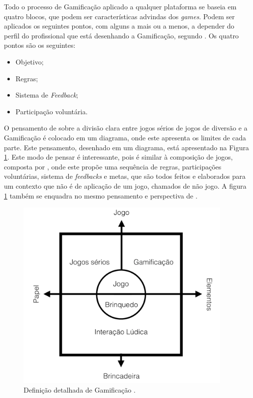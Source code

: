 Todo o processo de Gamificação aplicado a qualquer plataforma se baseia em
quatro blocos, que podem ser características advindas dos \textit{games}. Podem ser
aplicados os seguintes pontos, com alguns a mais ou a menos, a depender
do perfil do profissional que está desenhando a Gamificação, segundo \cite{mcgonigal2011reality}.
Os quatro pontos são os seguintes:

\begin{itemize}
    \item Objetivo;
    \item Regras;
    \item Sistema de \textit{Feedback};
    \item Participação voluntária.
\end{itemize}

O pensamento de \cite{deterding2011gamification}  sobre a divisão clara entre jogos sérios
de jogos de diversão e a Gamificação é colocado em um diagrama, onde este
apresenta os limites de cada parte. Este pensamento, desenhado em um diagrama,
está apresentado na Figura \ref{fig:gamificacaodetalhada}. Este modo de pensar é interessante, pois
é similar à composição de jogos, composta por \cite{mcgonigal2011reality}, onde este
propõe uma sequência de regras, participações voluntárias, sistema de
\textit{feedbacks} e metas, que são todos feitos e elaborados para um contexto que
não é de aplicação de um jogo, chamados de não jogo. A figura \ref{fig:gamificacaodetalhada}
também se enquadra no mesmo pensamento e perspectiva de \cite{mcgonigal2011reality}.

\begin{figure}[h]
    \centering
    \includegraphics[width=400px, scale=1]{figuras/gamificacaodetalhada}
    \caption{Definição detalhada de Gamificação \cite{mcgonigal2011reality}. }
    \label{fig:gamificacaodetalhada}
\end{figure}


